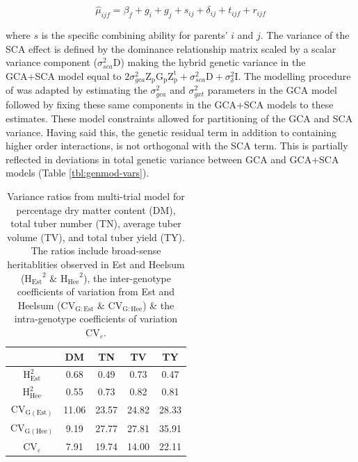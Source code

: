 \begin{equation}
 \hat{\mu}_{ijf} = \beta_f + g_i+g_j+s_{ij}+\delta_{ij}+t_{ijf}+r_{ijf}
\label{eq:sca}
\end{equation}

where \(s\) is the specific combining ability for parents' \(i\) and \(j\). The variance of the SCA effect is defined by the dominance relationship matrix scaled by a scalar variance component (\(\sigma^2_{sca} \mathrm{D}\)) making the hybrid genetic variance in the GCA+SCA model equal to \(2\sigma^2_{gca}\mathrm{Z_pG_pZ_p^t}+\sigma^2_{sca}\mathrm{D}+\sigma^2_{\delta}\mathrm I\). The modelling procedure of \parencite{Endelman2018} was adapted by estimating the \(\sigma^2_{gca}\) and \(\sigma^2_{gxt}\) parameters in the GCA model followed by fixing these same components in the GCA+SCA models to these estimates. These model constraints allowed for partitioning of the GCA and SCA variance. Having said this, the genetic residual term in addition to containing higher order interactions, is not orthogonal with the SCA term. This is partially reflected in deviations in total genetic variance between GCA and GCA+SCA models (Table \ref{tbl:genmod-vars}).

\begin{table}
    \caption{Variance ratios from multi-trial model for percentage dry matter content (DM), total tuber number (TN), average tuber volume (TV), and total tuber yield (TY). The ratios include broad-sense heritablities observed in Est and Heelsum (\(\mathrm{H_{Est}}^2\) \& \(\mathrm{H_{Hee}}^2\)), the inter-genotype coefficients of variation from Est and Heelsum (\(\mathrm{CV_{G:Est}}\) \& \(\mathrm{CV_{G:Hee}}\)) \&  the intra-genotype coefficients of variation \(\mathrm{CV}_{\varepsilon}\).}
\label{tbl:trait-variances}
\begin{tabular}{ccccc}
\toprule
 & DM & TN & TV & TY\\
\midrule
\(\mathrm{H_{Est}^2}\) & 0.68 & 0.49 & 0.73 & 0.47\\
\(\mathrm{H_{Hee}^2}\) & 0.55 & 0.73 & 0.82 & 0.81\\
\(\mathrm{CV_{G(Est)}}\) & 11.06 & 23.57 & 24.82 & 28.33\\
\(\mathrm{CV_{G(Hee)}}\) & 9.19 & 27.77 & 27.81 & 35.91\\
\(\mathrm{CV}_{\varepsilon}\) & 7.91 & 19.74 & 14.00 & 22.11\\
\bottomrule
\end{tabular}
\end{table}



